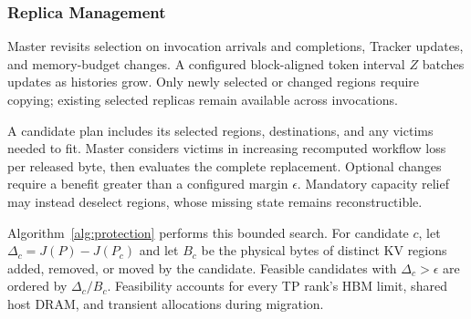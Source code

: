 \subsubsection{Replica Management}
\label{sec:master-online}
\label{sec:execution}

Master revisits selection on invocation arrivals and completions,
Tracker updates, and memory-budget changes. A configured block-aligned
token interval $Z$ batches updates as histories grow.
Only newly selected or changed regions require copying; existing
selected replicas remain available across invocations.

A candidate plan includes its selected regions, destinations, and any
victims needed to fit. Master considers victims in increasing
recomputed workflow loss per released byte, then evaluates the complete
replacement. Optional changes require a benefit greater than a
configured margin $\epsilon$. Mandatory capacity relief may instead
deselect regions, whose missing state remains reconstructible.

Algorithm~\ref{alg:protection} performs this bounded search.
For candidate $c$, let $\Delta_c=J(P)-J(P_c)$ and let $B_c$ be the physical
bytes of distinct KV regions added, removed, or moved by the candidate.
Feasible candidates with $\Delta_c>\epsilon$ are ordered by
$\Delta_c/B_c$. Feasibility accounts for every TP rank's HBM limit,
shared host DRAM, and transient allocations during migration.

